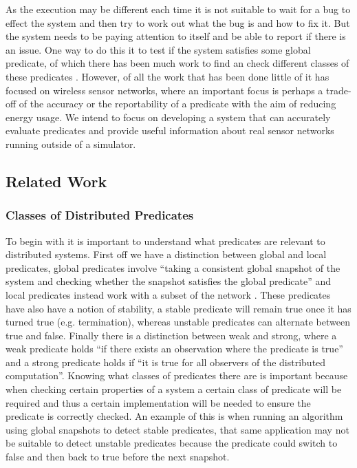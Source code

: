 As the execution may be different each time it is not suitable to wait for a bug to effect the system and then try to work out what the bug is and how to fix it. But the system needs to be paying attention to itself and be able to report if there is an issue. One way to do this it to test if the system satisfies some global predicate, of which there has been much work to find an check different classes of these predicates \cite{553309,345831,277788}. However, of all the work that has been done little of it has focused on wireless sensor networks, where an important focus is perhaps a trade-off of the accuracy or the reportability of a predicate with the aim of reducing energy usage. We intend to focus on developing a system that can accurately evaluate predicates and provide useful information about real sensor networks running outside of a simulator.


\subsection{Related Work}

\subsubsection*{Classes of Distributed Predicates}

To begin with it is important to understand what predicates are relevant to distributed systems. First off we have a distinction between global and local predicates, global predicates involve ``taking a consistent global snapshot of the system and checking whether the snapshot satisfies the global predicate'' \cite{277788} and local predicates instead work with a subset of the network \cite{553309}. These predicates have also have a notion of stability, a stable predicate will remain true once it has turned true (e.g. termination), whereas unstable predicates can alternate between true and false. Finally there is a distinction between weak and strong, where a weak predicate holds ``if there exists an observation where the predicate is true'' and a strong predicate holds if ``it is true for all observers of the distributed computation''.  \cite{553309,Cooper:1991:CDG:127695.122774} Knowing what classes of predicates there are is important because when checking certain properties of a system a certain class of predicate will be required and thus a certain implementation will be needed to ensure the predicate is correctly checked. An example of this is when running an algorithm using global snapshots to detect stable predicates, that same application may not be suitable to detect unstable predicates because the predicate could switch to false and then back to true before the next snapshot.

